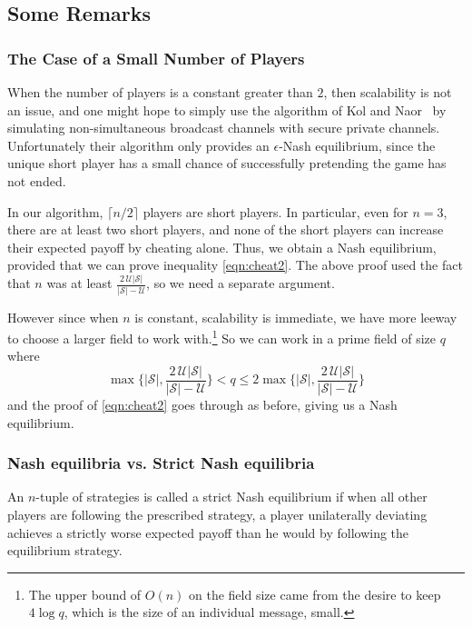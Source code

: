 \documentclass[12pt]{article}
\theoremstyle{definition}
\newcommand{\U}{\mathcal{U}}
\renewcommand{\S}{\mathcal{S}}
\begin{document}
\subsection{Some Remarks}
\subsubsection{The Case of a Small Number of Players}\label{sec:smalln}
When the number of players is a constant greater than $2$, then 
scalability is not an issue, and one might hope to simply use the algorithm of 
Kol and Naor~\cite{kol2008games} by simulating non-simultaneous broadcast 
channels with secure private channels. Unfortunately their algorithm only 
provides an $\epsilon$-Nash equilibrium, since the unique short player 
has a small chance of successfully pretending the game has not ended. 

In our algorithm, $\lceil n/2\rceil$ players are short players. In particular,
even for $n=3$, there are at least two short players, and none of the short 
players can increase their expected payoff by cheating alone. Thus, we 
obtain a Nash equilibrium, provided that we can prove inequality \eqref{eqn:cheat2}. 
The above proof used the fact that $n$ was at least 
$ \frac{2\,\U |\S|}{|\S|-\U}$, so we need a separate argument.

However  since when $n$ is constant, scalability is immediate, we have more leeway to 
choose a larger field to work with.\footnote{The upper bound of $O(n)$ on the field 
size came from the desire to keep $4\log q$, which is the size of an individual 
message, small.} So we can work in a prime field of size $q$ where 
\[
\max\{|\S|, \frac{2\,\U |\S|}{|\S|-\U}\} < q \le 
2 \max\{|\S|, \frac{2\,\U |\S|}{|\S|-\U}\}
\]
and the proof of  \eqref{eqn:cheat2} goes through as before, giving us a Nash 
equilibrium.


\subsubsection{Nash equilibria vs. Strict Nash equilibria}

An $n$-tuple of strategies is called a strict Nash equilibrium
if when all other players are following the prescribed strategy, 
a player unilaterally deviating  achieves a strictly worse expected payoff 
than he would by following the equilibrium strategy. 
\end{document}

